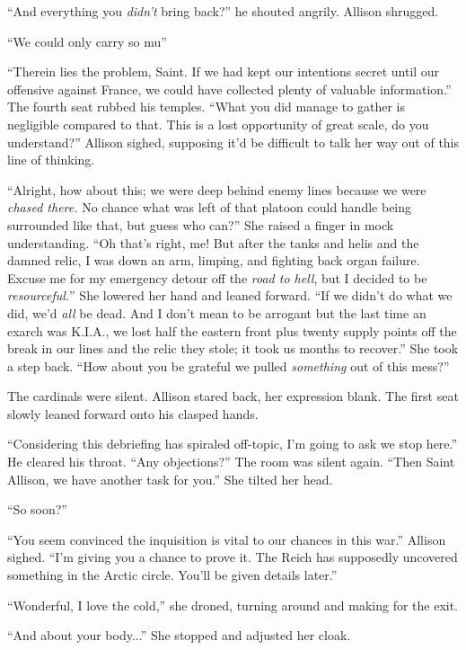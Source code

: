\begin{Standard}
``And everything you \emph{didn't} bring back?'' he shouted angrily. Allison shrugged.

``We could only carry so mu\textemdash{}''

``Therein lies the problem, Saint. If we had kept our intentions secret until our offensive
against France, we could have collected plenty of valuable information.'' The fourth seat rubbed
his temples. ``What you did manage to gather is negligible compared to that. This is
a lost opportunity of great scale, do you understand?'' Allison sighed, supposing it'd be
difficult to talk her way out of this line of thinking.

``Alright, how about this; we were deep behind enemy lines because we were \emph{chased there.}
No chance what was left of that platoon could handle being surrounded like that, but guess who
can?'' She raised a finger in mock understanding. ``Oh that's right, me! But after the tanks
and helis and the damned relic, I was down an arm, limping, and fighting back organ failure.
Excuse me for my emergency detour off the \emph{road to hell}, but I decided to be \emph{resourceful.}''
She lowered her hand and leaned forward. ``If we didn't do what we did, we'd \emph{all} be dead.
And I don't mean to be arrogant but the last time an exarch was K.I.A., we lost half the eastern front
plus twenty supply points off the break in our lines and the relic they stole; it took us
months to recover.'' She took a step back. ``How about you be grateful we pulled
\emph{something} out of this mess?''

The cardinals were silent. Allison stared back, her expression blank. The first seat slowly
leaned forward onto his clasped hands.

``Considering this debriefing has spiraled off-topic, I'm going to ask we stop here.'' He cleared
his throat. ``Any objections?'' The room was silent again. ``Then Saint Allison, we have
another task for you.'' She tilted her head.

``So soon?''

``You seem convinced the inquisition is vital to our chances in this war.'' Allison sighed.
``I'm giving you a chance to prove it. The Reich has supposedly uncovered something in the
Arctic circle. You'll be given details later.''

``Wonderful, I love the cold,'' she droned, turning around and making for the exit.

``And about your body...'' She stopped and adjusted her cloak.


\end{Standard}
